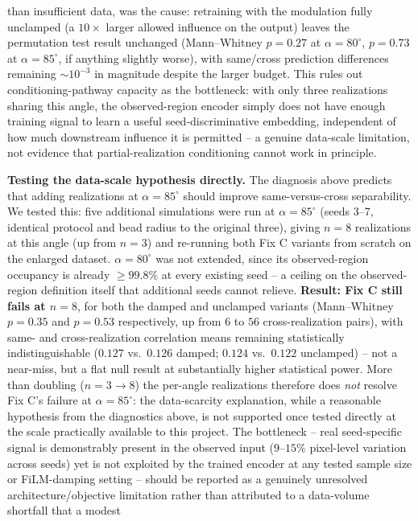 \documentclass[aip,amsmath,amssymb,reprint]{revtex4-1}
\renewcommand{\ang}{\ensuremath{\alpha}} %
\begin{document}
than insufficient data, was the cause: retraining with the modulation fully
unclamped (a $10\times$ larger allowed influence on the output) leaves the
permutation test result unchanged (Mann--Whitney $p=0.27$ at $\ang=80^{\circ}$,
$p=0.73$ at $\ang=85^{\circ}$, if anything slightly worse), with same/cross
prediction differences remaining $\sim 10^{-3}$ in magnitude despite the
larger budget. This rules out conditioning-pathway capacity as the
bottleneck: with only three realizations sharing this angle, the
observed-region encoder simply does not have enough training signal to learn
a useful seed-discriminative embedding, independent of how much downstream
influence it is permitted -- a genuine data-scale limitation, not evidence
that partial-realization conditioning cannot work in principle.

\textbf{Testing the data-scale hypothesis directly.} The diagnosis above
predicts that adding realizations at $\ang=85^{\circ}$ should improve
same-versus-cross separability. We tested this: five additional
simulations were run at $\ang=85^{\circ}$ (seeds 3--7, identical protocol and bead
radius to the original three), giving $n=8$ realizations at this angle
(up from $n=3$) and re-running both Fix C variants from scratch on the
enlarged dataset. $\ang=80^{\circ}$ was not extended, since its observed-region
occupancy is already $\geq 99.8\%$ at every existing seed -- a ceiling on
the observed-region definition itself that additional seeds cannot relieve.
\textbf{Result: Fix C still fails at $n=8$}, for both the damped and
unclamped variants (Mann--Whitney $p=0.35$ and $p=0.53$ respectively, up
from $6$ to $56$ cross-realization pairs), with same- and
cross-realization correlation means remaining statistically
indistinguishable ($0.127$ vs.\ $0.126$ damped; $0.124$ vs.\ $0.122$
unclamped) -- not a near-miss, but a flat null result at substantially
higher statistical power. More than doubling ($n=3\to8$) the per-angle
realizations therefore does \emph{not} resolve Fix C's failure at
$\ang=85^{\circ}$: the data-scarcity explanation, while a reasonable hypothesis
from the diagnostics above, is not supported once tested directly at the
scale practically available to this project. The bottleneck -- real
seed-specific signal is demonstrably present in the observed input
($9$--$15\%$ pixel-level variation across seeds) yet is not exploited by
the trained encoder at any tested sample size or FiLM-damping setting --
should be reported as a genuinely unresolved architecture/objective
limitation rather than attributed to a data-volume shortfall that a modest
\end{document}
